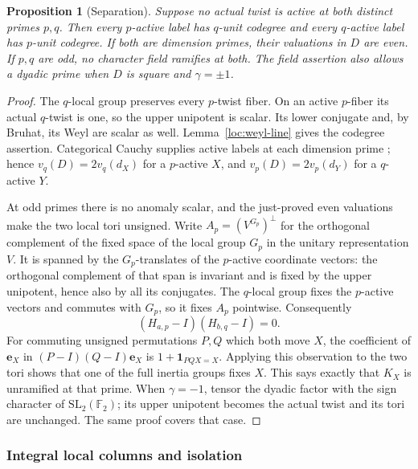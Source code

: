 \documentclass[11pt,a4paper]{article}
\numberwithin{equation}{section}
\newtheorem{proposition}[theorem]{Proposition}
\begin{document}
\begin{proposition}[Separation]\label{loc:separation}
Suppose no actual twist is active at both distinct primes $p,q$.
Then every $p$-active label has $q$-unit codegree and every
$q$-active label has $p$-unit codegree.
If both are dimension primes, their valuations in $D$ are even.
If $p,q$ are odd, no character field ramifies at both. The field
assertion also allows a dyadic prime when $D$ is square and
$\gamma=\pm1$.
\end{proposition}
\begin{proof}
The $q$-local group preserves every $p$-twist fiber. On an active
$p$-fiber its actual $q$-twist is one, so the upper unipotent is
scalar. Its lower conjugate and, by Bruhat, its Weyl are scalar as
well. Lemma~\ref{loc:weyl-line} gives the codegree assertion.
Categorical Cauchy supplies active labels at each dimension prime
\cite[Theorem~3.9]{BNRWFinite}; hence
$v_q(D)=2v_q(d_X)$ for a $p$-active $X$, and $v_p(D)=2v_p(d_Y)$ for a $q$-active $Y$.

At odd primes there is no anomaly scalar, and the just-proved even
valuations make the two local tori unsigned. Write
$A_p=(V^{G_p})^\perp$ for the orthogonal complement of the fixed space
of the local group $G_p$ in the unitary representation $V$. It is
spanned by the $G_p$-translates of the $p$-active coordinate vectors:
the orthogonal complement of that span is invariant and is fixed by
the upper unipotent, hence also by all its conjugates. The $q$-local
group fixes the $p$-active vectors and commutes with $G_p$, so it
fixes $A_p$ pointwise. Consequently
\[
                  (H_{a,p}-I)(H_{b,q}-I)=0.
\]
For commuting unsigned permutations $P,Q$ which both move $X$,
the coefficient of $\mathbf e_X$ in $(P-I)(Q-I)\mathbf e_X$ is
$1+\mathbf1_{PQX=X}$. Applying this observation to the two tori
shows that one of the full inertia groups fixes $X$. This says exactly that
$K_X$ is unramified at that prime. When $\gamma=-1$, tensor the
dyadic factor with the sign character of
$\mathrm{SL}_2(\mathbb F_2)$; its upper unipotent becomes the actual
twist and its tori are unchanged. The same proof covers that case.
\end{proof}

\subsubsection{Integral local columns and isolation}
\end{document}
